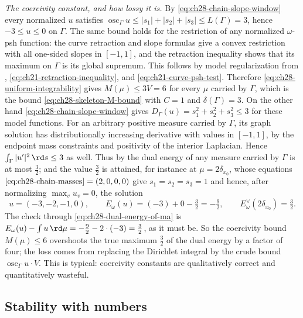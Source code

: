 \begin{example}[{The chain $\Gamma=[0,3]$: a solved equation, verified}]
\emph{The coercivity constant, and how lossy it is.}  By
\eqref{eq:ch28-chain-slope-window} every normalized $u$ satisfies
$\operatorname{osc}_\Gamma u\leq|s_1|+|s_2|+|s_3|\leq L(\Gamma)=3$, hence
$-3\leq u\leq0$ on $\Gamma$.  The same bound holds for the
restriction of any normalized $\omega$-psh function: the curve
retraction and slope formulas give a convex restriction with all
one-sided slopes in $[-1,1]$, and the retraction inequality shows that
its maximum on $\Gamma$ is its global supremum.  This follows by model
regularization from ,
\eqref{eq:ch21-retraction-inequality}, and
\eqref{eq:ch21-curve-psh-test}.  Therefore
\eqref{eq:ch28-uniform-integrability} gives $M(\mu)\leq3V=6$ for every
$\mu$ carried by $\Gamma$, which is the bound
\eqref{eq:ch28-skeleton-M-bound} with $C=1$ and
$\delta(\Gamma)=3$.  On the other hand
\eqref{eq:ch28-chain-slope-window} gives
$D_\Gamma(u)=s_1^2+s_2^2+s_3^2\leq3$ for these model functions.
For an arbitrary positive measure carried by $\Gamma$, its graph
solution has distributionally increasing derivative with values in
$[-1,1]$, by the endpoint mass constraints and positivity of the
interior Laplacian.  Hence $\int_\Gamma|u'|^2\,\rd s\leq3$ as well.
Thus by
 the dual energy of any measure carried by
$\Gamma$ is at most $\tfrac32$; and the value $\tfrac32$ is attained,
for instance at $\mu=2\delta_{x_0}$, whose equations
$\eqref{eq:ch28-chain-masses}=(2,0,0,0)$ give
$s_1=s_2=s_3=1$ and hence, after normalizing $\max_vu_v=0$, the solution
\[
 u=(-3,-2,-1,0),
 \qquad
 E_\omega(u)=(-3)+0-\tfrac32=-\tfrac92,
 \qquad
 E^\vee_\omega(2\delta_{x_0})=\tfrac32 .
\]
The check through \eqref{eq:ch28-dual-energy-of-ma} is
$E_\omega(u)-\int u\,\rd\mu=-\tfrac92-2\cdot(-3)=\tfrac32$, as it must be.
So the coercivity bound $M(\mu)\leq6$ overshoots the true maximum
$\tfrac32$ of the dual energy by a factor of four; the loss comes from
replacing the Dirichlet integral by the crude bound
$\operatorname{osc}_\Gamma u\cdot V$.  This is typical: coercivity
constants are qualitatively correct and quantitatively wasteful.
\end{example}

\subsection{Stability with numbers}
\label{sec:ch28-stability-numbers}

